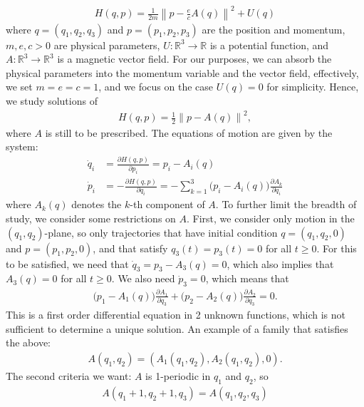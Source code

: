 \begin{align*}
H(q,p) = \frac{1}{2m}\left\|p - \frac{e}{c}A(q)\right\|^2 + U(q)
\end{align*}
where $q=(q_1,q_2,q_3)$ and $p=(p_1,p_2,p_3)$ are the position and momentum, $m,e,c>0$ are physical parameters, $U:\mathbb R^3\to\mathbb R$ is a potential function, and $A:\mathbb R^3\to\mathbb R^3$ is a magnetic vector field. For our purposes, we can absorb the physical parameters into the momentum variable and the vector field, effectively, we set $m=e=c=1$, and we focus on the case $U(q)=0$ for simplicity. Hence, we study solutions of
\begin{align}\label{eq:magnetichamiltonian}
H(q,p) = \frac{1}{2}\left\|p - A(q)\right\|^2,
\end{align}
where $A$ is still to be prescribed. The equations of motion are given by the system:
\begin{subequations}
\label{eq:magnetichamiltonianequations}
\begin{align}
\dot q_i &= \frac{\partial H(q,p)}{\partial p_i} = p_i - A_i(q) \label{subeq:maghameqpos}\\
\dot p_i &= -\frac{\partial H(q,p)}{\partial q_i} = -\sum_{k=1}^3 \Big(p_i - A_i(q)\Big)\frac{\partial A_k}{\partial q_i}\label{subeq:maghammom}
\end{align}
\end{subequations}
where $A_k(q)$ denotes the $k$-th component of $A$. To further limit the breadth of study, we consider some restrictions on $A$. First, we consider only motion in the $(q_1,q_2)$-plane, so only trajectories that have initial condition $q=(q_1,q_2,0)$ and $p=(p_1,p_2,0)$, and that satisfy $q_3(t)=p_3(t)=0$ for all $t\ge0$. For this to be satisfied, we need that $\dot q_3 = p_3-A_3(q)=0$, which also implies that $A_3(q)=0$ for all $t\ge 0$. We also need $\dot p_3 = 0$, which means that 
\begin{align*}
\Big(p_1 - A_1(q)\Big)\frac{\partial A_1}{\partial q_3} +\Big(p_2 - A_2(q)\Big)\frac{\partial A_2}{\partial q_3}=0.
\end{align*}
This is a first order differential equation in 2 unknown functions, which is not sufficient to determine a unique solution. An example of a family that satisfies the above: 
\begin{align*}
A(q_1,q_2) = (A_1(q_1,q_2),A_2(q_1,q_2),0).
\end{align*}
The second criteria we want: $A$ is 1-periodic in $q_1$ and $q_2$, so 
\begin{align*}
A(q_1+1,q_2+1,q_3)=A(q_1,q_2,q_3)
\end{align*}
